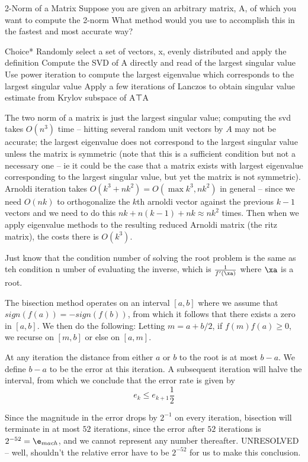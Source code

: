 \documentclass[../main.tex]{subfiles}
\begin{document}
2-Norm of a Matrix
Suppose you are given an arbitrary matrix, A, of which you want to compute the 2-norm 
What method would you use to accomplish this in the fastest and most accurate way?

Choice*
Randomly select a set of vectors, x, evenly distributed and apply the definition
Compute the SVD of A directly and read of the largest singular value
Use power iteration to compute the largest eigenvalue which corresponds to the largest singular value
Apply a few iterations of Lanczos to obtain singular value estimate from Krylov subspace of A⊤A
\begin{solution}
    The two norm of a matrix is just the largest singular value; computing the svd takes $O(n^3)$ time -- hitting several random unit vectors by $A$ may not be accurate; the largest eigenvalue does not correspond to the largest singular value unless the matrix is symmetric (note that this is a sufficient condition but not a necessary one -- ie it could be the case that a matrix exists with largest eigenvalue corresponding to the largest singular value, but yet the matrix is not symmetric). Arnoldi iteration takes $O(k^3 + nk^2) = O(\max{k^3, nk^2})$ in general -- since we need $O(nk)$ to orthogonalize the $k$th arnoldi vector against the previous $k-1$ vectors and we need to do this $nk + n(k-1) + nk \approx nk^2$ times. Then when we apply eigenvalue methods to the resulting reduced Arnoldi matrix (the ritz matrix), the costs there is $O(k^3)$. 
\end{solution}


Just know that the condition number of solving the root problem is the same as teh condition n umber of evaluating the inverse, which is $\frac{1}{f'(\xa)}$ where $\xa$ is a root.

    \begin{definition}
        The bisection method operates on an interval $[a,b]$ where we assume that $sign\left( f(a) \right) =  -sign\left( f(b) \right)$, from which it follows that there exists a zero in $[a,b]$. We then do the following: Letting $m = a + b /2$, if $f(m)f(a) \geq 0$, we recurse on $[m,b]$ or else on $[a,m]$.
    \end{definition}
    \begin{remark}
        At any iteration the distance from either $a$ or $b$ to the root is at most $b - a$. We define $b-a$ to be the error at this iteration. A subsequent iteration will halve the interval, from which we conclude that the error rate is given by
        \[
            e_k \leq e_{k+1}\frac{1}{2}
        \]
    \end{remark}
    \begin{remark}
        Since the magnitude in the error drops by $2^{-1}$ on every iteration, bisection will terminate in at most $52$ iterations, since the error after $52$ iterations is $2^{-52} = \e_{mach}$, and we cannot represent any number thereafter. UNRESOLVED -- well, shouldn't the relative error have to be $2^{-52}$ for us to make this conclusion.
    \end{remark}
\end{document}
